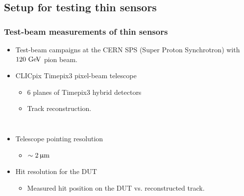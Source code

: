\subsection{Setup for testing thin sensors}
\begin{frame}
  \frametitle{}
  \tableofcontents[currentsubsection]
\end{frame}
\begin{frame}
  \frametitle{Test-beam measurements of thin sensors}

  \begin{itemize}
  \item Test-beam campaigns at the CERN SPS (Super Proton Synchrotron)
    with $120\,\mathrm{\,Ge\kern -0.1em V}$ pion beam.
  \item CLICpix Timepix3 pixel-beam telescope
    \begin{itemize}
    \item 6 planes of Timepix3 hybrid detectors
    \item Track reconstruction.
    \end{itemize}
  \end{itemize}


  \begin{columns}

    
    \begin{itemize}
    \item Telescope pointing resolution
      \begin{itemize}
      \item \textcolor{Green}{$\sim2\,\upmu\mathrm{m}$}
      \end{itemize}
    \item Hit resolution for the DUT
      \begin{itemize}
      \item Measured hit position on the DUT
        vs. reconstructed track.
      \end{itemize}
    \end{itemize}


\end{columns}
\end{frame}

